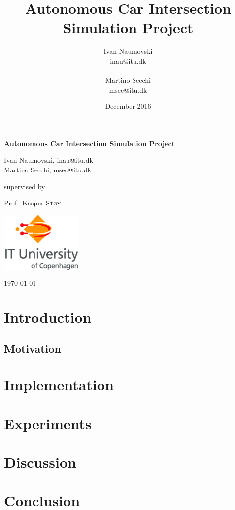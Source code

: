 \documentclass[titlepage]{article}
\title{Autonomous Car Intersection Simulation Project}
\author{
   Ivan Naumovski\\
    {inau@itu.dk}\\
    \\
   Martino Secchi\\
    {msec@itu.dk}\\
}
\date{December 2016}
\begin{document}

\begin{titlepage}
	\centering

	{\huge\bfseries Autonomous Car Intersection Simulation Project \par}
	\vspace{2cm}
	{\Large Ivan Naumovski, {inau@itu.dk}\\ Martino Secchi, {msec@itu.dk}\\\par}
	\vfill
	supervised by\par
	\large Prof.~Kasper \textsc{St\o y}

	\vfill
	\includegraphics[width=0.3\textwidth]{img/itulogo.jpg}\par\vspace{1cm}
	{\large \today\par}
\end{titlepage}

\clearpage
\tableofcontents
\clearpage


\abstract{

}
\section{Introduction}


\subsection{Motivation}


\section{Implementation}


\section{Experiments}


\section{Discussion}


\section{Conclusion}




\pagebreak
\appendix

\end{document}
